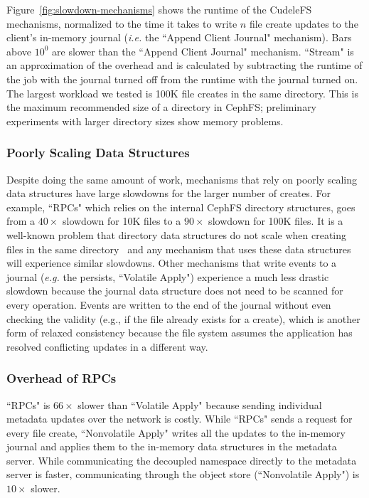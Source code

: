 Figure~\ref{fig:slowdown-mechanisms} shows the runtime of the CudeleFS
mechanisms, normalized to the time it takes to write \(n\) file create updates
to the client's in-memory journal ({\it i.e.} the ``Append Client Journal"
mechanism). Bars above \(10^0\) are slower than the ``Append Client Journal"
mechanism.  ``Stream" is an approximation of the
overhead and is calculated by subtracting the runtime of the job with the
journal turned off from the runtime with the journal turned on.  The largest
workload we tested is 100K file creates in the same directory.  This is the
maximum recommended size of a directory in CephFS; preliminary experiments with
larger directory sizes show memory problems.

\subsubsection{Poorly Scaling Data Structures} Despite doing the same amount of
work, mechanisms that rely on poorly scaling data structures have large
slowdowns for the larger number of creates. For example, ``RPCs" which relies
on the internal CephFS directory structures, goes from a \(40\times\) slowdown
for 10K files to a \(90\times\) slowdown for 100K files. It is a well-known
problem that directory data structures do not scale when creating files in the
same directory~\cite{ren:sc2014-indexfs} and any mechanism that uses these data
structures will experience similar slowdowns. Other mechanisms that write
events to a journal ({\it e.g.} the persists, ``Volatile Apply") experience a
much less drastic slowdown because the journal data structure does not need to
be scanned for every operation. Events are written to the end of the journal without
even checking the validity ({e.g.}, if the file already exists for a create),
which is another form of relaxed consistency because the file system assumes the
application has resolved conflicting updates in a different way.

\subsubsection{Overhead of RPCs} ``RPCs" is \(66\times\) slower than ``Volatile
Apply" because sending individual metadata updates over the network is costly.
While ``RPCs" sends a request for every file create, ``Nonvolatile Apply"
writes all the updates to the in-memory journal and applies them to the
in-memory data structures in the metadata server. While communicating the
decoupled namespace directly to the metadata server is faster, communicating
through the object store (``Nonvolatile Apply") is \(10\times\) slower.

